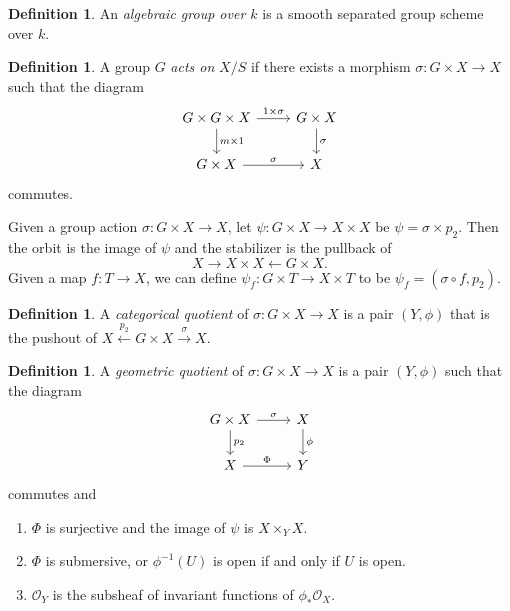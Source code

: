\documentclass[leqno, openany]{memoir}
\theoremstyle{definition}
\newtheorem{defn}[thm]{Definition}
\theoremstyle{remark}
\theoremstyle{plain}
\theoremstyle{definition}
\theoremstyle{remark}
\newcommand{\mc}[1]{\mathcal{#1}}
\begin{document}
\begin{defn} An \textit{algebraic group over $k$}  is a smooth separated group
scheme over $k$.  \end{defn}

\begin{defn} A group $G$ \textit{acts on} $X / S$ if there exists a morphism
    $\sigma \colon G \times X \to X$ such that the diagram \begin{equation}
        \begin{tikzcd} G \times G \times X \arrow{r}{1 \times \sigma}
            \arrow{d}{m \times 1} & G \times X \arrow{d}{\sigma} \\ G \times X
        \arrow{r}{\sigma} & X \end{tikzcd} \end{equation} commutes.  \end{defn}

Given a group action $\sigma \colon G \times X \to X$, let $\psi \colon G
\times X \to X \times X$ be $\psi = \sigma \times p_2$. Then the orbit is the
image of $\psi$ and the stabilizer is the pullback of \[ X \to X \times X \gets
G \times X. \] Given a map $f \colon T \to X$, we can define $\psi_f \colon G
\times T \to X \times T$ to be $\psi_f = (\sigma \circ f, p_2)$.

\begin{defn} A \textit{categorical quotient} of $\sigma \colon G \times X \to
X$ is a pair $(Y, \phi)$ that is the pushout of $X \xleftarrow{p_2} G \times X
\xrightarrow{\sigma} X$.  \end{defn}

\begin{defn} A \textit{geometric quotient} of $\sigma \colon G \times X \to X$
    is a pair $(Y, \phi)$ such that the diagram \begin{equation} \begin{tikzcd}
        G \times X \arrow{r}{\sigma} \arrow{d}{p_2} & X \arrow{d}{\phi} \\ X
        \arrow{r}{\Phi} & Y \end{tikzcd} \end{equation} commutes and
        \begin{enumerate}[label=(\arabic*)] \item $\Phi$ is surjective and the
            image of $\psi$ is $X \times_Y X$.  \item $\Phi$ is submersive, or
            $\phi^{-1}(U)$ is open if and only if $U$ is open.  \item
    $\mc{O}_Y$ is the subsheaf of invariant functions of $\phi_* \mc{O}_X$.
    \end{enumerate} \end{defn}
\end{document}
